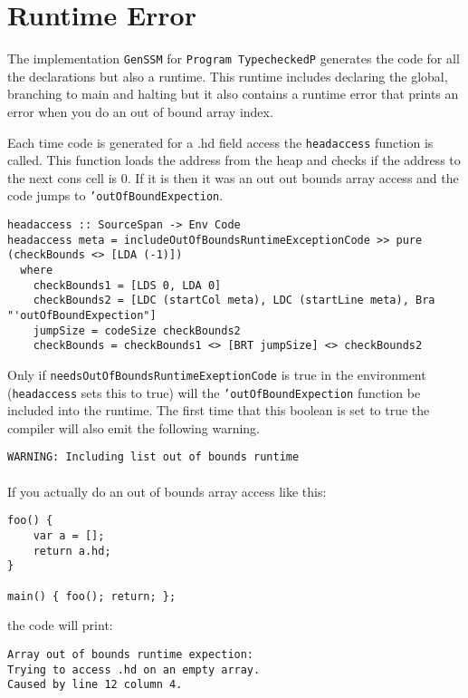 \documentclass{report}
\begin{document}
\section{Runtime Error}

The implementation \texttt{GenSSM} for \texttt{Program TypecheckedP} generates the code for all the declarations but also a runtime. This runtime includes declaring the global, branching to main and halting but it also contains a runtime error that prints an error when you do an out of bound array index. 

Each time code is generated for a .hd field access the \texttt{headaccess} function is called. This function loads the address from the heap and checks if the address to the next cons cell is 0. If it is then it was an out out bounds array access and the code jumps to \texttt{'outOfBoundExpection}.

\begin{verbatim}
headaccess :: SourceSpan -> Env Code
headaccess meta = includeOutOfBoundsRuntimeExceptionCode >> pure (checkBounds <> [LDA (-1)])
  where
    checkBounds1 = [LDS 0, LDA 0]
    checkBounds2 = [LDC (startCol meta), LDC (startLine meta), Bra "'outOfBoundExpection"]
    jumpSize = codeSize checkBounds2
    checkBounds = checkBounds1 <> [BRT jumpSize] <> checkBounds2
\end{verbatim}

Only if \texttt{needsOutOfBoundsRuntimeExeptionCode} is true in the environment (\texttt{headaccess} sets this to true) will the \texttt{'outOfBoundExpection} function be included into the runtime. The first time that this boolean is set to true the compiler will also emit the following warning. 

\noindent \texttt{\textcolor{warning}{WARNING:} Including list out of bounds runtime}
\\\\
\noindent If you actually do an out of bounds array access like this:

\begin{lstlisting}[style=SPL]
foo() {
    var a = [];
    return a.hd;
}

main() { foo(); return; }; 
\end{lstlisting}

\noindent the code will print:

\noindent \texttt{Array out of bounds runtime expection:\\
Trying to access .hd on an empty array.\\
Caused by line 12 column 4.\\
}
\end{document}
